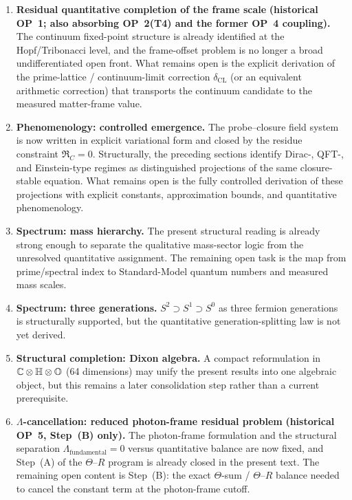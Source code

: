 \begin{enumerate}
  \item \textbf{Residual quantitative completion of the frame scale}
        \textbf{(historical OP~1; also absorbing OP~2(T4) and the former OP~4 coupling).}
        The continuum fixed-point structure is already identified at the
        Hopf/Tribonacci level, and the frame-offset problem is no longer a
        broad undifferentiated open front. What remains open is the explicit
        derivation of the prime-lattice / continuum-limit correction
        $\delta_{\mathrm{CL}}$ (or an equivalent arithmetic correction)
        that transports the continuum candidate to the measured matter-frame
        value.

  \item \textbf{Phenomenology: controlled emergence.}
        The probe--closure field system is now written in explicit
        variational form and closed by the residue constraint
        $\mathfrak R_C=0$.
        Structurally, the preceding sections identify Dirac-, QFT-, and
        Einstein-type regimes as distinguished projections of the same
        closure-stable equation. What remains open is the fully controlled
        derivation of these projections with explicit constants,
        approximation bounds, and quantitative phenomenology.

  \item \textbf{Spectrum: mass hierarchy.}
        The present structural reading is already strong enough to separate the
        qualitative mass-sector logic from the unresolved quantitative
        assignment. The remaining open task is the map from prime/spectral
        index to Standard-Model quantum numbers and measured mass scales.

  \item \textbf{Spectrum: three generations.}
        $S^2\supset S^1\supset S^0$ as three fermion generations is
        structurally supported, but the quantitative generation-splitting law
        is not yet derived.

  \item \textbf{Structural completion: Dixon algebra.}
        A compact reformulation in
        $\mathbb{C}\otimes\mathbb{H}\otimes\mathbb{O}$ (64 dimensions) may unify
        the present results into one algebraic object, but this remains a
        later consolidation step rather than a current prerequisite.

  \item \textbf{$\Lambda$-cancellation: reduced photon-frame residual problem}
        \textbf{(historical OP~5, Step~(B) only).}
        The photon-frame formulation and the structural separation
        $\Lambda_{\mathrm{fundamental}}=0$ versus quantitative balance are now
        fixed, and Step~(A) of the $\Theta$--$R$ program is already closed in
        the present text. The remaining open content is Step~(B): the exact
        $\Theta$-sum / $\Theta$--$R$ balance needed to cancel the constant term
        at the photon-frame cutoff.
\end{enumerate}

